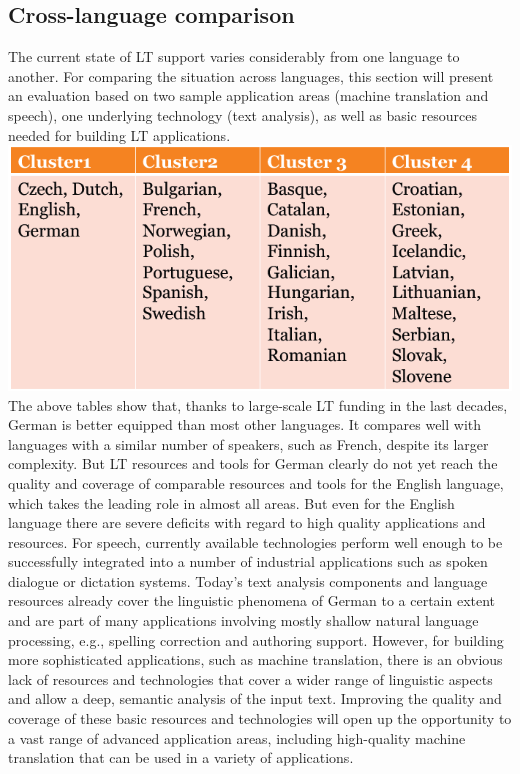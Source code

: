 \documentclass[]{../metanetpaper}
\begin{document}
	\subsection{Cross-language comparison}
The current state of LT support varies considerably from one language to another. For comparing the situation across languages, this section will present an evaluation based on two sample application areas (machine translation and speech), one underlying technology (text analysis), as well as basic resources needed for building LT applications.\\ 
\includegraphics[scale=0.3]{media/bild.png}
The above tables show that, thanks to large-scale LT funding in the last decades, German is better equipped than most other languages. It compares well with languages with a similar number of speakers, such as French, despite its larger complexity. But LT resources and tools for German clearly do not yet reach the quality and coverage of comparable resources and tools for the English language, which takes the leading role in almost all areas. But even for the English language there are severe deficits with regard to high quality applications and resources.
For speech, currently available technologies perform well enough to be successfully integrated into a number of industrial applications such as spoken dialogue or dictation systems. Today’s text analysis components and language resources already cover the linguistic phenomena of German to a certain extent and are part of many applications involving mostly shallow natural language processing, e.g., spelling correction and authoring support.
However, for building more sophisticated applications, such as machine translation, there is an obvious lack of resources and technologies that cover a wider range of linguistic aspects and allow a deep, semantic analysis of the input text. Improving the quality and coverage of these basic resources and technologies will open up the opportunity to a vast range of advanced application areas, including high-quality machine translation that can be used in a variety of applications. 
\end{document}
